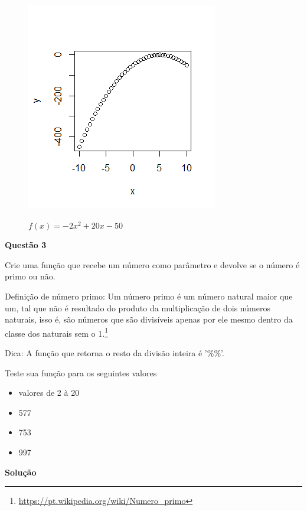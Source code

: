 \documentclass[12pt, a4paper]{article}
\begin{document}
\begin{figure}[H]
	\caption{$f(x) = -2x^2 + 20x - 50$}
	\centering
	\includegraphics[scale=1]{images/function4.png}
	\label{fig:function4}
\end{figure}




\textbf{Questão 3}

Crie uma função que recebe um número como parâmetro e devolve se o número é primo ou não.

Definição de número primo: Um número primo é um número natural maior que um, tal que não é resultado do produto da multiplicação de dois números naturais, isso é, são números que são divisíveis apenas por ele mesmo dentro da classe dos naturais sem o 1.\footnote{\url{https://pt.wikipedia.org/wiki/Numero_primo}}

Dica: A função que retorna o resto da divisão inteira é '\%\%'.

Teste sua função para os seguintes valores

\begin{itemize}
	\item valores de 2 à 20
	\item 577
	\item 753
	\item 997
\end{itemize}



\textbf{Solução}



	
\end{document}
